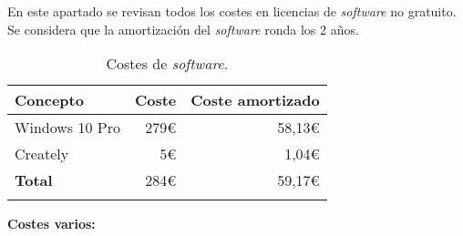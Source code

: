 En este apartado se revisan todos los costes en licencias de
\emph{software} no gratuito. Se considera que la amortización del
\emph{software} ronda los 2 años.

\begin{longtable}[]{@{}lrr@{}}
\toprule
\begin{minipage}[b]{0.24\columnwidth}\raggedright\strut
\textbf{Concepto}\strut
\end{minipage} & \begin{minipage}[b]{0.18\columnwidth}\raggedright\strut
\textbf{Coste}\strut
\end{minipage} & \begin{minipage}[b]{0.32\columnwidth}\raggedright\strut
\textbf{Coste amortizado}\strut
\end{minipage}\tabularnewline
\midrule
\endhead
\begin{minipage}[t]{0.24\columnwidth}\raggedright\strut
Windows 10 Pro\strut
\end{minipage} & \begin{minipage}[t]{0.18\columnwidth}\raggedright\strut
279\euro{}\strut
\end{minipage} & \begin{minipage}[t]{0.32\columnwidth}\raggedright\strut
58,13\euro{}\strut
\end{minipage}\tabularnewline
\begin{minipage}[t]{0.24\columnwidth}\raggedright\strut
Creately\strut
\end{minipage} & \begin{minipage}[t]{0.18\columnwidth}\raggedright\strut
5\euro{}\strut
\end{minipage} & \begin{minipage}[t]{0.32\columnwidth}\raggedright\strut
1,04\euro{}\strut
\end{minipage}\tabularnewline
\midrule
\begin{minipage}[t]{0.24\columnwidth}\raggedright\strut
\textbf{Total}\strut
\end{minipage} & \begin{minipage}[t]{0.18\columnwidth}\raggedright\strut
284\euro{}\strut
\end{minipage} & \begin{minipage}[t]{0.32\columnwidth}\raggedright\strut
59,17\euro{}\strut
\end{minipage}\tabularnewline
\bottomrule
\caption{Costes de \emph{software}.}
\end{longtable}

\textbf{Costes varios:}


